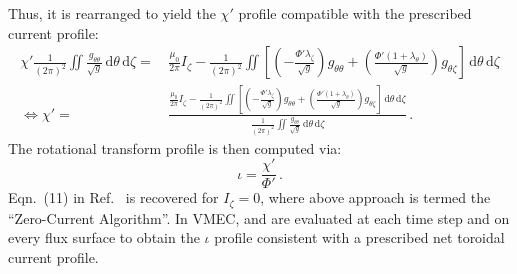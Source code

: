 Thus, it is rearranged to yield the $\chi'$ profile compatible with the prescribed current profile:
\begin{align}
 \chi' \frac{1}{(2 \pi)^2} \iint \frac{g_{\theta \theta}}{\sqrt{g}} \,\mathrm{d}\theta \,\mathrm{d}\zeta
  =&\,
   \frac{\mu_0}{2 \pi} I_\zeta
 - \frac{1}{(2 \pi)^2}
   \iint \left[  \left(    - \frac{\Phi' \lambda_\zeta  }{\sqrt{g}} \right) g_{\theta \theta}
               + \left( \frac{\Phi' (1 + \lambda_\theta)}{\sqrt{g}} \right) g_{\theta \zeta } \right] \,\mathrm{d}\theta \,\mathrm{d}\zeta \\
\Leftrightarrow
 \chi'
  =&\,
  \frac{\frac{\mu_0}{2 \pi} I_\zeta - \frac{1}{(2 \pi)^2} \iint \left[  \left(    - \frac{\Phi' \lambda_\zeta  }{\sqrt{g}} \right) g_{\theta \theta}
                                                                      + \left( \frac{\Phi' (1 + \lambda_\theta)}{\sqrt{g}} \right) g_{\theta \zeta } \right] \,\mathrm{d}\theta \,\mathrm{d}\zeta}
       {\frac{1}{(2 \pi)^2} \iint \frac{g_{\theta \theta}}{\sqrt{g}} \,\mathrm{d}\theta \,\mathrm{d}\zeta} \, . \label{eqn:chip_from_current_constraint}
\end{align}
The rotational transform profile is then computed via:
\begin{equation}
 \iota = \frac{\chi'}{\Phi'} \, . \label{eqn:iota_from_fluxes}
\end{equation}
Eqn.~(11) in Ref.~\cite{hirshman_hogan_1986} is recovered for $I_\zeta = 0$, where above approach is termed the ``Zero-Current Algorithm''.
In VMEC,  and  are evaluated at each time step and on every flux surface
to obtain the $\iota$ profile consistent with a prescribed net toroidal current profile.

